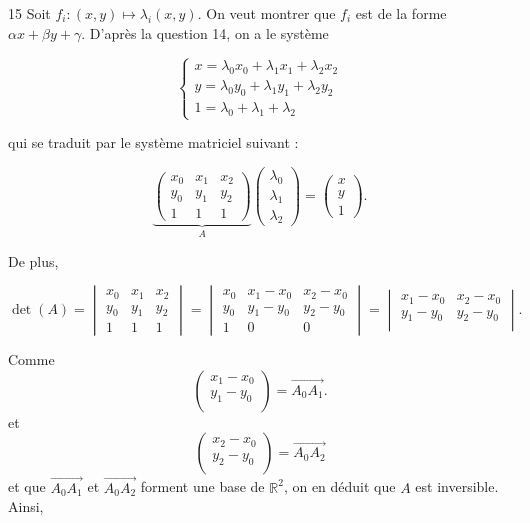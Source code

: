 
\begin{reponse}{15}
Soit $f_i : (x,y) \longmapsto \lambda_i(x,y)$. On veut montrer que $f_i$ est de la forme $\alpha x + \beta y + \gamma $. D'après la question 14, on a le système

\[
\begin{cases}
    x = \lambda_0x_0+\lambda_1x_1 + \lambda_2x_2 \\
    y= \lambda_0y_0+\lambda_1y_1 + \lambda_2y_2 \\
    1 = \lambda_0+\lambda_1+\lambda_2
\end{cases}
\]

qui se traduit par le système matriciel suivant :

$$
\underbrace{
\begin{pmatrix}
    x_0 & x_1 & x_2 \\
    y_0 & y_1 & y_2 \\
    1 & 1 & 1
\end{pmatrix}}_{A} \begin{pmatrix}
    \lambda_0 \\
    \lambda_1 \\
    \lambda_2
\end{pmatrix} =\begin{pmatrix}
    x \\
    y \\
    1
\end{pmatrix}.
$$

De plus, 

$$
\det(A) = 
\begin{vmatrix}
    x_0 & x_1 & x_2 \\
    y_0 & y_1 & y_2 \\
    1 & 1 & 1
\end{vmatrix} = \begin{vmatrix}
    x_0 & x_1-x_0 & x_2-x_0 \\
    y_0 & y_1-y_0 & y_2-y_0 \\
    1 & 0 & 0
\end{vmatrix} = \begin{vmatrix}
    x_1-x_0 & x_2-x_0 \\
    y_1-y_0 & y_2-y_0 \\
\end{vmatrix}.
$$

Comme $$
\begin{pmatrix}
    x_1-x_0 \\
    y_1-y_0\\
\end{pmatrix} = \overset{\rightarrow}{A_0A_1}.
$$ et $$
\begin{pmatrix}
    x_2-x_0 \\
    y_2-y_0\\
\end{pmatrix} = \overset{\rightarrow}{A_0A_2}$$ et que $\overset{\rightarrow}{A_0A_1}$ et $\overset{\rightarrow}{A_0A_2}$ forment une base de $\mathbb{R}^2$, on en déduit que $A$ est inversible. Ainsi,


\end{reponse}
